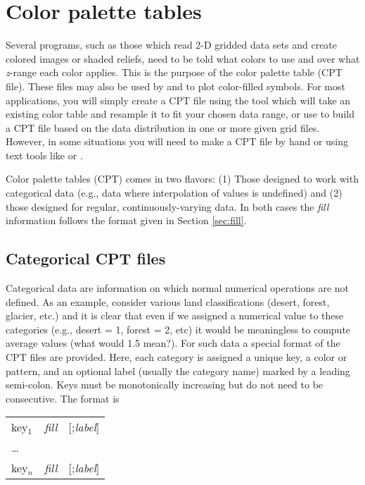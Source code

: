 \section{Color palette tables}


Several programs, such as those which read 2-D gridded data sets and create
colored images or shaded reliefs, need to be told what colors to use and
over what \emph{z}-range each color applies.  This is the purpose of the
color palette table (CPT file).  These files may also be used by 
and  to plot color-filled symbols.  For most applications, you
will simply create a CPT file using the tool  which will
take an existing color table and resample it to fit your chosen data
range, or use  to build a CPT file based on the data distribution
in one or more given grid files.  However, in some situations you will need to make a CPT file by
hand or using text tools like  or .

Color palette tables (CPT) comes in two flavors: (1) Those designed to work with
categorical data (e.g., data where interpolation of values is undefined) and
(2) those designed for regular, continuously-varying data.  In both cases
the {\it fill} information follows the format given in Section \ref{sec:fill}.

\subsection{Categorical CPT files}

Categorical data are information on which normal numerical operations are not
defined. As an example, consider various land classifications (desert, forest, glacier, etc.)
and it is clear that even if we assigned a numerical value to these categories (e.g.,
desert = 1, forest = 2, etc) it would be meaningless to compute average values (what would
1.5 mean?).  For such data a special format of the CPT files are provided.  Here,
each category is assigned a unique key, a color or pattern, and an optional
label (usually the category name) marked by a leading semi-colon.  Keys must be
monotonically increasing but do not need to be consecutive.  The format is

\begin{center}
\begin{tabular}{lll}
key$_1$ &  {\it fill} &  [;\emph{label}] \\ 
\ldots & & \\ 
key$_n$ &  {\it fill} &  [;\emph{label}] \\ 
\end{tabular} 
\end{center}

